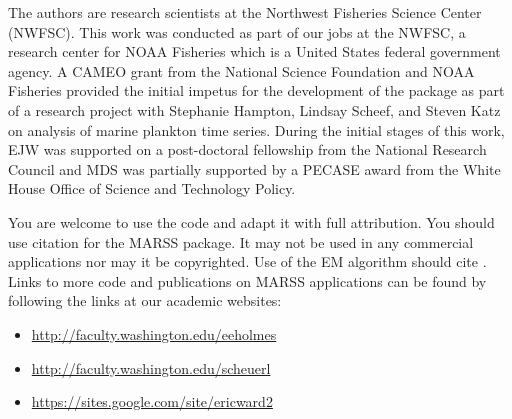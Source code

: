The authors are research scientists at the Northwest Fisheries Science Center (NWFSC).  This work was conducted as part of our jobs at the NWFSC, a research center for NOAA Fisheries which is a United States federal government agency.   A CAMEO grant from the National Science Foundation and NOAA Fisheries provided the initial impetus for the development of the package as part of a research project with Stephanie Hampton, Lindsay Scheef, and Steven Katz on analysis of marine plankton time series.  During the initial stages of this work, EJW was supported on a post-doctoral fellowship from the National Research Council and MDS was partially supported by a PECASE award from the White House Office of Science and Technology Policy.

You are welcome to use the code and adapt it with full attribution.  You should use citation \citet{Holmesetal2012} for the MARSS package.  It may not be used in any commercial applications nor may it be copyrighted.  Use of the EM algorithm should cite \citet{Holmes2010}. Links to more code and publications on MARSS applications can be found by following the links at our academic websites:
\begin{itemize}
\item \url{http://faculty.washington.edu/eeholmes}
\item \url{http://faculty.washington.edu/scheuerl}
\item \url{https://sites.google.com/site/ericward2}
\end{itemize}